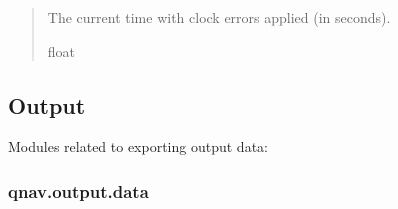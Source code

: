 \documentclass[letterpaper,10pt,english]{sphinxmanual}
\begin{document}
\begin{fulllineitems}
\begin{fulllineitems}
\begin{quote}
\begin{description}
\sphinxAtStartPar
The current time with clock errors applied (in seconds).

\sphinxAtStartPar
float

\end{description}\end{quote}

\end{fulllineitems}


\end{fulllineitems}



\subsection{Output}
\label{\detokenize{usage/packages:output}}
\sphinxAtStartPar
Modules related to exporting output data:

\sphinxstepscope


\subsubsection{qnav.output.data}
\label{\detokenize{modules/output/data:module-qnav.output.data}}\label{\detokenize{modules/output/data:qnav-output-data}}\label{\detokenize{modules/output/data::doc}}
\end{document}
